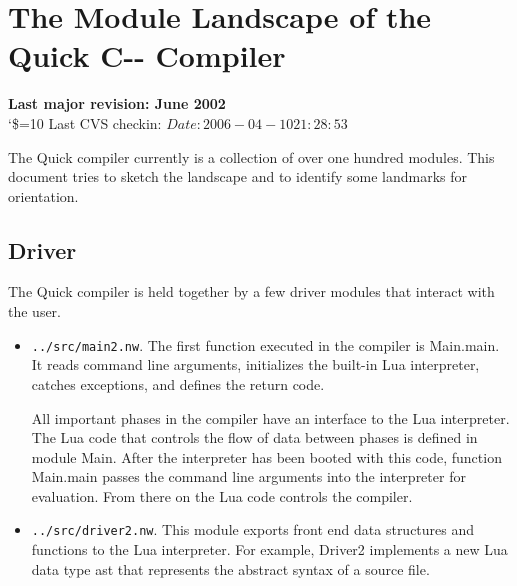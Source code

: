 \documentclass{article}%
\begin{document}
\section{The Module Landscape of the Quick C\hbox{-{}-} Compiler}

\ifx\module\undefined
  \newcommand\module[1]
    {\hyperlink{module.#1}{\texttt{#1} module} (Ch\ref{#1-module}, p\pageref{#1-module})}
  \newcommand\inmodule[2]{\hyperlink{module.#1}{\emph{#2}} (\texttt{#1.nw})}
  \newcommand\markmodule[1]{\hypertarget{module.#1}{\label{#1-module}}}
  \renewcommand\module[1]{\texttt{#1.nw}}
\fi




\begin{center}
\textbf{Last major revision: June 2002}\\
\catcode`\$=10 %
Last CVS checkin: $Date: 2006-04-10 21:28:53 $
\end{center}


The Quick {\PAL} compiler currently is a collection of over one hundred
modules. This document tries to sketch the landscape and to identify
some landmarks for orientation.

\subsection{Driver}

The Quick {\PAL} compiler is held together by a few driver modules that
interact with the user. 

\begin{itemize} 

\item \module{../src/main2}. The first function executed in the compiler
is {\Tt{}Main.main\nwendquote}. It reads command line arguments, initializes the
built-in Lua interpreter, catches exceptions, and defines the return
code. 

All important phases in the compiler have an interface to the Lua
interpreter. The Lua code that controls the flow of data between phases
is defined in module {\Tt{}Main\nwendquote}. After the interpreter has been booted
with this code, function {\Tt{}Main.main\nwendquote} passes the command line arguments
into the interpreter for evaluation. From there on the Lua code controls
the compiler.

\item \module{../src/driver2}. This module exports front end data
structures and functions to the Lua interpreter. For example,
{\Tt{}Driver2\nwendquote} implements a new Lua data type {\Tt{}ast\nwendquote} that represents the
abstract syntax of a {\PAL} source file. 
\end{itemize}
\end{document}
